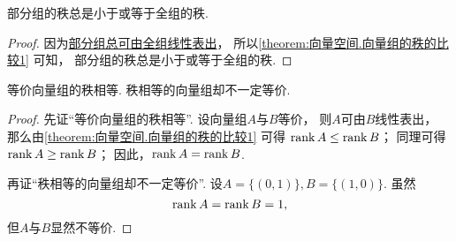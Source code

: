 \begin{corollary}\label{theorem:向量空间.向量组的秩的比较2}
部分组的秩总是小于或等于全组的秩.
\begin{proof}
因为\hyperref[theorem:线性方程组.部分组可由全组线性表出]{部分组总可由全组线性表出}，
所以\cref{theorem:向量空间.向量组的秩的比较1} 可知，
部分组的秩总是小于或等于全组的秩.
\end{proof}
\end{corollary}

\begin{theorem}\label{theorem:向量组的秩.等价向量组的秩相等}
等价向量组的秩相等.
秩相等的向量组却不一定等价.
\begin{proof}
先证“等价向量组的秩相等”.
设向量组\(A\)与\(B\)等价，
则\(A\)可由\(B\)线性表出，
那么由\cref{theorem:向量空间.向量组的秩的比较1} 可得%
\(\rank A \leq \rank B\)；
同理可得\(\rank A \geq \rank B\)；
因此，\(\rank A = \rank B\).

再证“秩相等的向量组却不一定等价”.
设\(A=\{(0,1)\},
B=\{(1,0)\}\).
虽然\begin{equation*}
	\rank A = \rank B = 1,
\end{equation*}
但\(A\)与\(B\)显然不等价.
\end{proof}
\end{theorem}

